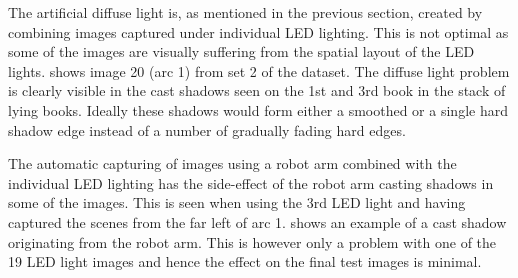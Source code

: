 \documentclass[thesis.tex]{subfiles}
\begin{document}
The artificial diffuse light is, as mentioned in the previous section, created by combining images captured under individual LED lighting. This is not optimal as some of the images are visually suffering from the spatial layout of the LED lights.  shows image 20 (arc 1) from set 2 of the dataset. The diffuse light problem is clearly visible in the cast shadows seen on the 1st and 3rd book in the stack of lying books. Ideally these shadows would form either a smoothed or a single hard shadow edge instead of a number of gradually fading hard edges.

The automatic capturing of images using a robot arm combined with the individual LED lighting has the side-effect of the robot arm casting shadows in some of the images. This is seen when using the 3rd LED light and having captured the scenes from the far left of arc 1.  shows an example of a cast shadow originating from the robot arm. This is however only a problem with one of the 19 LED light images and hence the effect on the final test images is minimal.
%
\end{document}
